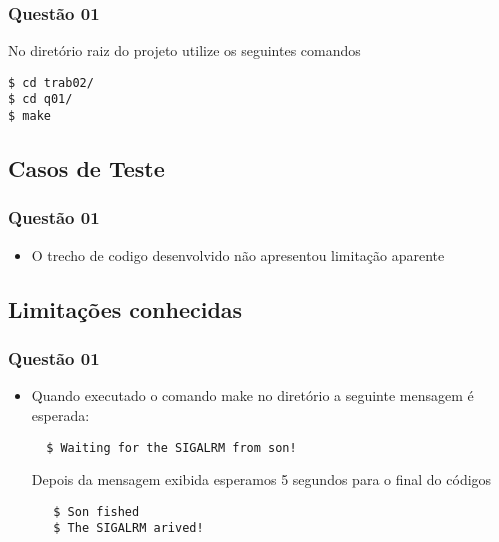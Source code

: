 \documentclass[11pt,a4paper]{article}
\begin{document}
\subsubsection{Questão 01}
No diretório raiz do projeto utilize os seguintes comandos
\begin{verbatim}
$ cd trab02/
$ cd q01/
$ make
\end{verbatim}


\subsection{Casos de Teste}

\subsubsection{Questão 01}
\begin{itemize}
  \item O trecho de codigo desenvolvido não apresentou limitação aparente
\end{itemize}


\subsection{Limitações conhecidas}
\subsubsection{Questão 01}
\begin{itemize}
  \item Quando executado o comando make no diretório a seguinte mensagem é esperada:

  \begin{verbatim}
  $ Waiting for the SIGALRM from son!
   \end{verbatim}

  Depois da mensagem exibida esperamos 5 segundos para o final do códigos \\

  \begin{verbatim}
   $ Son fished
   $ The SIGALRM arived! 
  \end{verbatim}





\end{itemize}
\end{document}
